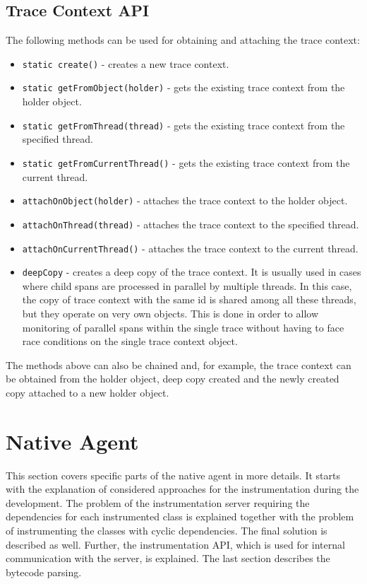 \subsection{Trace Context API}
\label{imp:trace_context_api}
The following methods can be used for obtaining and attaching the trace context:
\begin{itemize}
	\item \texttt{static create()} - creates a new trace context.
	\item \texttt{static getFromObject(holder)} - gets the existing trace context from the holder object.
	\item \texttt{static getFromThread(thread)} - gets the existing trace context from the specified thread.
	\item \texttt{static getFromCurrentThread()} -  gets the existing trace context from the current thread.
	\item \texttt{attachOnObject(holder)} - attaches the trace context to the holder object.
	\item \texttt{attachOnThread(thread)} - attaches the trace context to the specified \newline thread.
	\item \texttt{attachOnCurrentThread()} - attaches the trace context to the current \newline thread.
	\item \texttt{deepCopy} - creates a deep copy of the trace context. It is usually used in cases where child spans are processed in parallel by multiple threads. In this case, the copy of trace context with the same id is shared among all these threads, but they operate on very own objects. This is done in order to allow monitoring of parallel spans within the single trace without having to face race conditions on the single trace context object.
\end{itemize}

The methods above can also be chained and, for example, the trace context can be obtained from the holder object, deep copy created and the newly created copy attached to a new holder object.


\section{Native Agent}
This section covers specific parts of the native agent in more details. It starts with the explanation of considered approaches for the instrumentation during the development. The problem of the instrumentation server requiring the dependencies for each instrumented class is explained together with the problem of instrumenting the classes with cyclic dependencies. The final solution is described as well. Further, the instrumentation API, which is used for internal communication with the server, is explained. The last section describes the bytecode parsing.
